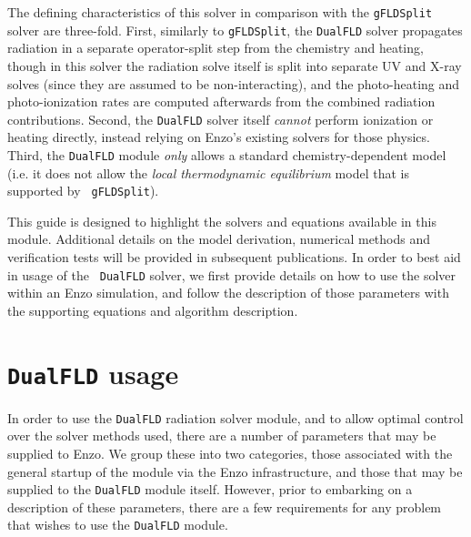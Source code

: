 \documentclass[letterpaper,10pt]{article}
\renewcommand{\(}{\left(}
\renewcommand{\)}{\right)}
\begin{document}
The defining characteristics of this solver in comparison
with the {\tt gFLDSplit} solver are three-fold.  First, similarly to
{\tt gFLDSplit}, the {\tt DualFLD} solver propagates radiation in a
separate operator-split step from the chemistry and heating, though in
this solver the radiation solve itself is split into separate UV and
X-ray solves (since they are assumed to be non-interacting), and the
photo-heating and photo-ionization rates are computed afterwards from
the combined radiation contributions.  Second, the {\tt DualFLD}
solver itself {\em cannot} perform ionization or heating directly,
instead relying on Enzo's existing solvers for those physics.  Third,
the {\tt DualFLD} module {\em only} allows a standard
chemistry-dependent model (i.e. it does not allow the {\em local
thermodynamic equilibrium} model that is supported by {\tt
gFLDSplit}).  

This guide is designed to highlight the solvers and equations
available in this module.  Additional details on the model derivation,
numerical methods and verification tests will be provided in
subsequent publications.  In order to best aid in usage of the {\tt
DualFLD} solver, we first provide details on how to use the solver
within an Enzo simulation, and follow the description of those
parameters with the supporting equations and algorithm description.



\section{{\tt DualFLD} usage}
\label{sec:module_usage}

In order to use the {\tt DualFLD} radiation solver module, and to
allow optimal control over the solver methods used, there are a number
of parameters that may be supplied to Enzo.  We group these into two
categories, those associated with the general startup of the module
via the Enzo infrastructure, and those that may be supplied to the
{\tt DualFLD} module itself.  However, prior to embarking on a
description of these parameters, there are a few requirements for any
problem that wishes to use the {\tt DualFLD} module. 
\end{document}
